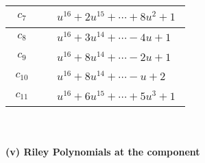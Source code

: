\documentclass[1p]{elsarticle_modified}
\theoremstyle{definition}
\begin{document}
\begin{tabular}{m{50pt}|m{274pt}}
\hline $$\begin{aligned}c_{7}\end{aligned}$$&$\begin{aligned}
&u^{16}+2 u^{15}+\cdots+8 u^2+1
\end{aligned}$\\
\hline $$\begin{aligned}c_{8}\end{aligned}$$&$\begin{aligned}
&u^{16}+3 u^{14}+\cdots-4 u+1
\end{aligned}$\\
\hline $$\begin{aligned}c_{9}\end{aligned}$$&$\begin{aligned}
&u^{16}+8 u^{14}+\cdots-2 u+1
\end{aligned}$\\
\hline $$\begin{aligned}c_{10}\end{aligned}$$&$\begin{aligned}
&u^{16}+8 u^{14}+\cdots- u+2
\end{aligned}$\\
\hline $$\begin{aligned}c_{11}\end{aligned}$$&$\begin{aligned}
&u^{16}+6 u^{15}+\cdots+5 u^3+1
\end{aligned}$\\
\hline
\end{tabular}\\~\\
\newpage\renewcommand{\arraystretch}{1}
\flushleft \textbf{(v) Riley Polynomials at the component}\newline \\
\end{document}
